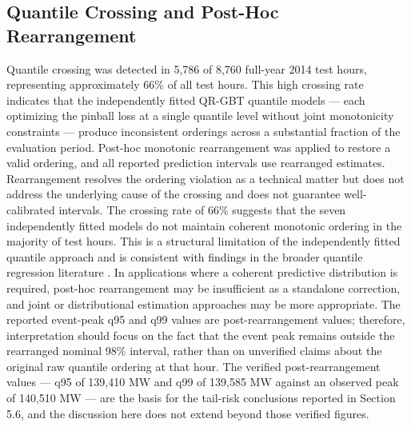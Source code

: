 \documentclass[12pt,a4paper]{article}
\begin{document}
\subsection{Quantile Crossing and Post-Hoc Rearrangement}
Quantile crossing was detected in 5,786 of 8,760 full-year 2014 test hours, representing approximately 66\% of all test hours. This high crossing rate indicates that the independently fitted QR-GBT quantile models --- each optimizing the pinball loss at a single quantile level without joint monotonicity constraints --- produce inconsistent orderings across a substantial fraction of the evaluation period. Post-hoc monotonic rearrangement was applied to restore a valid ordering, and all reported prediction intervals use rearranged estimates. Rearrangement resolves the ordering violation as a technical matter but does not address the underlying cause of the crossing and does not guarantee well-calibrated intervals.
The crossing rate of 66\% suggests that the seven independently fitted models do not maintain coherent monotonic ordering in the majority of test hours. This is a structural limitation of the independently fitted quantile approach and is consistent with findings in the broader quantile regression literature \cite{chernozhukov2010quantile}. In applications where a coherent predictive distribution is required, post-hoc rearrangement may be insufficient as a standalone correction, and joint or distributional estimation approaches may be more appropriate.
The reported event-peak q95 and q99 values are post-rearrangement values; therefore, interpretation should focus on the fact that the event peak remains outside the rearranged nominal 98\% interval, rather than on unverified claims about the original raw quantile ordering at that hour. The verified post-rearrangement values --- q95 of 139,410 MW and q99 of 139,585 MW against an observed peak of 140,510 MW --- are the basis for the tail-risk conclusions reported in Section 5.6, and the discussion here does not extend beyond those verified figures.
\end{document}
